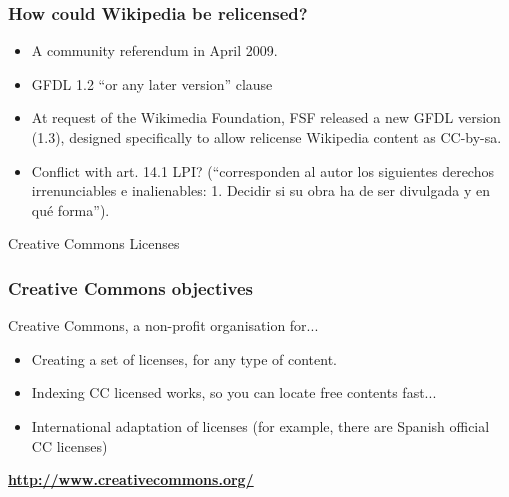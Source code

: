 
\begin{frame}
\frametitle {How could Wikipedia be relicensed?}

\pause

\begin{itemize}
\item A community referendum in April 2009.
\item GFDL 1.2 ``\alert{or} any later version'' clause
\item At request of the Wikimedia Foundation, FSF released a new GFDL version (1.3), designed
specifically to allow relicense Wikipedia content as CC-by-sa.
\item Conflict with art. 14.1 LPI? (``corresponden al autor los siguientes derechos irrenunciables e \alert{inalienables}: 1. Decidir si su obra ha de ser divulgada y en qué forma'').
\end{itemize}

\end{frame}



\begin{frame}
\begin{center}
\huge{Creative Commons Licenses}
\end{center}

\end{frame}


\begin{frame}
\frametitle{Creative Commons objectives}

Creative Commons, a non-profit organisation for...

\begin{itemize}
\item Creating a set of licenses, for any type of content.
\item Indexing CC licensed works, so you can locate free contents fast...
\item International adaptation of licenses (for example, there are
  Spanish official CC licenses)
\end{itemize}
\vspace{1cm}
\begin{center}
{\LARGE
\textbf{\url{http://www.creativecommons.org/}}
}
\end{center}

\end{frame}

